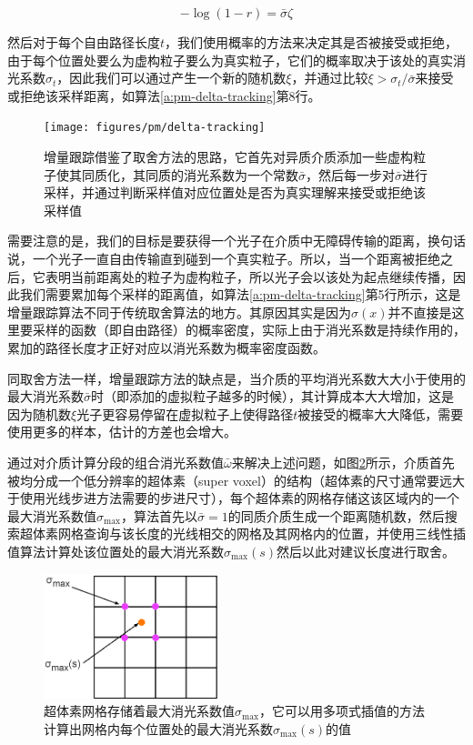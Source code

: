 \begin{equation}
	-\log(1-r)=\bar{\sigma}\zeta
\end{equation}

然后对于每个自由路径长度$t$，我们使用概率的方法来决定其是否被接受或拒绝，由于每个位置处要么为虚构粒子要么为真实粒子，它们的概率取决于该处的真实消光系数$\sigma_t$，因此我们可以通过产生一个新的随机数$\xi$，并通过比较$\xi>\sigma_t/\bar{\sigma}$来接受或拒绝该采样距离，如算法\ref{a:pm-delta-tracking}第8行。

\begin{figure}
	\texttt{[image: figures/pm/delta-tracking]}
	\caption{增量跟踪借鉴了取舍方法的思路，它首先对异质介质添加一些虚构粒子使其同质化，其同质的消光系数为一个常数$\bar{\sigma}$，然后每一步对$\bar{\sigma}$进行采样，并通过判断采样值对应位置处是否为真实理解来接受或拒绝该采样值}
	\label{f:pm-delta-tracking}
\end{figure}

需要注意的是，我们的目标是要获得一个光子在介质中无障碍传输的距离，换句话说，一个光子一直自由传输直到碰到一个真实粒子。所以，当一个距离被拒绝之后，它表明当前距离处的粒子为虚构粒子，所以光子会以该处为起点继续传播，因此我们需要累加每个采样的距离值，如算法\ref{a:pm-delta-tracking}第5行所示，这是增量跟踪算法不同于传统取舍算法的地方。其原因其实是因为$\sigma(x)$并不直接是这里要采样的函数（即自由路径）的概率密度，实际上由于消光系数是持续作用的，累加的路径长度才正好对应以消光系数为概率密度函数。

同取舍方法一样，增量跟踪方法的缺点是，当介质的平均消光系数大大小于使用的最大消光系数$\bar{\sigma}$时（即添加的虚拟粒子越多的时候），其计算成本大大增加，这是因为随机数$\xi$光子更容易停留在虚拟粒子上使得路径$t$被接受的概率大大降低，需要使用更多的样本，估计的方差也会增大。

\cite{a:FreePathSamplinginHighResolutionInhomogeneousParticipatingMedia}通过对介质计算分段的组合消光系数值$\bar{\omega}$来解决上述问题，如图\ref{f:pm-super-voxels}所示，介质首先被均分成一个低分辨率的超体素（super voxel）的结构（超体素的尺寸通常要远大于使用光线步进方法需要的步进尺寸），每个超体素的网格存储这该区域内的一个最大消光系数值$\sigma_{\max}$，算法首先以$\bar{\sigma}=1$的同质介质生成一个距离随机数，然后搜索超体素网格查询与该长度的光线相交的网格及其网格内的位置，并使用三线性插值算法计算处该位置处的最大消光系数$\sigma_{\max}(s)$然后以此对建议长度进行取舍。

\begin{figure}
	\sidecaption
	\includegraphics[width=0.45\textwidth]{figures/pm/super-voxels}
	\caption{超体素网格存储着最大消光系数值$\sigma_{\max}$，它可以用多项式插值的方法计算出网格内每个位置处的最大消光系数$\sigma_{\max}(s)$的值}
	\label{f:pm-super-voxels}
\end{figure}





